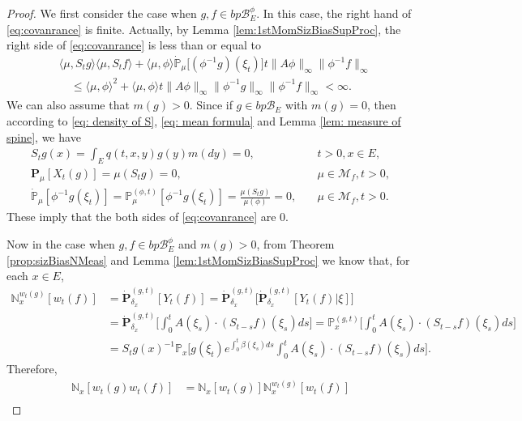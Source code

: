 \documentclass[UTF8]{pkuthss}
\theoremstyle{plain}
\theoremstyle{definition}
\numberwithin{equation}{section}
\begin{document}
\begin{proof}
	We first consider the case when $g,f\in bp\mathscr B^\phi_E$.
	In this case, the right hand of \eqref{eq:covanrance} is finite.
	Actually,
	by Lemma \ref{lem:1stMomSizBiasSupProc},
	the right side of \eqref{eq:covanrance} is less than or equal to
\[\begin{split}
	&\langle \mu, S_tg \rangle \langle\mu,S_t f \rangle +
\langle \mu,\phi\rangle\dot{\mathbb P}_\mu\big[(\phi^{-1}g)(\xi_t)\big] t \|A\phi\|_\infty \|\phi^{-1}f\|_\infty\\
	&\quad \leq \langle \mu,\phi \rangle^2 + \langle \mu,\phi\rangle t \|A\phi\|_\infty \|\phi^{-1}g\|_\infty\|\phi^{-1}f\|_\infty
	< \infty.
\end{split}\]
	We can also assume that $m(g)>0$.
 Since if $g\in bp\mathscr B_E$ with $m(g)=0$, then according to \eqref{eq: density of S}, \eqref{eq: mean formula} and Lemma \ref{lem: measure of spine}, we have
\begin{align}
	S_t g(x) = \int_{E} q(t,x,y) g(y)m(dy) = 0,
	&\quad t > 0, x\in E,
	\\\mathbf P_\mu [X_t(g)] = \mu(S_t g)  = 0,
	&\quad \mu \in \mathcal M_f, t>0,
	\\\dot{\mathbb P}_\mu [\phi^{-1}g(\xi_t)] = \mathbb P_\mu^{(\phi,t)}[\phi^{-1}g(\xi_t)]
	= \frac{\mu(S_t g)}{\mu(\phi)}
	= 0,
	&\quad \mu \in \mathcal M_f, t>0.
\end{align}
These imply that the both sides of \eqref{eq:covanrance} are $0$.
\par
	Now in the case when $g,f\in bp\mathscr B^\phi_E$ and $m(g)>0$, from
    Theorem \ref{prop:sizBiasNMeas} and
	Lemma \ref{lem:1stMomSizBiasSupProc} we know that, for each $x\in E$,
	\[\begin{split}
	\mathbb N_x^{w_t(g)}[w_t(f)]
	&= \dot{\mathbf P}_{\delta_x}^{(g,t)}[Y_t(f)]
	= \dot{\mathbf P}_{\delta_x}^{(g,t)} \big[\dot{\mathbf P}_{\delta_x}^{(g,t)}[Y_t(f) | \xi]\big]\\
	&= \dot{\mathbf P}_{\delta_x}^{(g,t)} \Big[\int_0^t  A(\xi_s) \cdot (S_{t-s}  f)(\xi_s) ds\Big]
	= \mathbb P_x^{(g,t)} \Big[\int_0^t  A (\xi_s)\cdot (S_{t-s} f)(\xi_s) ds\Big]\\
	&= S_t g(x)^{-1} \mathbb P_{x} \Big[g(\xi_t) e^{\int_0^t \beta(\xi_s) ds} \int_0^t A(\xi_s)\cdot (S_{t-s} f)(\xi_s) ds\Big].
\end{split}\]
	Therefore,
\begin{equation}\begin{split}
	\mathbb N_x[w_t(g) w_t( f)]
	&= \mathbb N_x[w_t(g)] \mathbb N_x^{w_t(g)}[w_t(f)]\\

\end{split}
\end{equation}
\end{proof}
\end{document}
